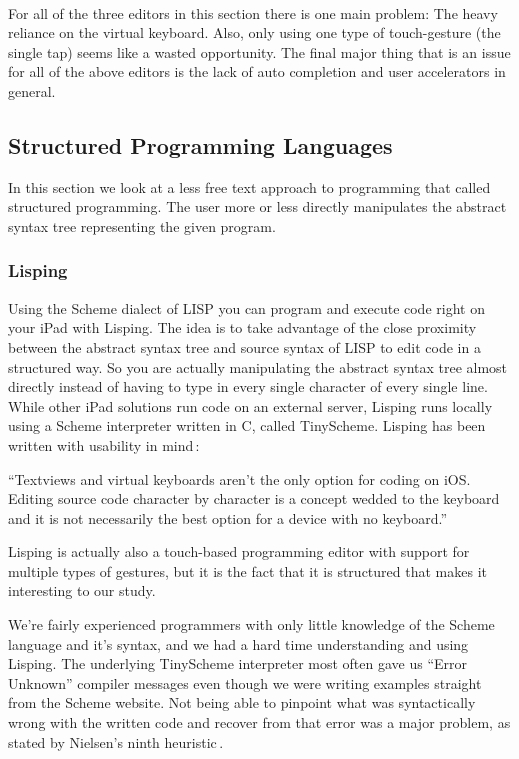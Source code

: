 \paragraph{}

For all of the three editors in this section there is one main problem: The heavy reliance on the virtual keyboard. Also, only using one type of touch-gesture (the single tap) seems like a wasted opportunity. The final major thing that is an issue for all of the above editors is the lack of auto completion and user accelerators in general.


\subsection{Structured Programming Languages}
In this section we look at a less free text approach to programming that called structured programming. The user more or less directly manipulates the abstract syntax tree representing the given program.

\subsubsection{Lisping}

Using the Scheme dialect of LISP you can program and execute code right on your iPad with Lisping. The idea is to take advantage of the close proximity between the abstract syntax tree and source syntax of LISP to edit code in a structured way. So you are actually manipulating the abstract syntax tree almost directly instead of having to type in every single character of every single line. While other iPad solutions run code on an external server, Lisping runs locally using a Scheme interpreter written in C, called TinyScheme. Lisping has been written with usability in mind\,\cite{lisping}: 

``Textviews and virtual keyboards aren't the only option for coding on iOS. Editing source code character by character is a concept wedded to the keyboard and it is not necessarily the best option for a device with no keyboard.''

Lisping is actually also a touch-based programming editor with support for multiple types of gestures, but it is the fact that it is structured that makes it interesting to our study.

We're fairly experienced programmers with only little knowledge of the Scheme language and it's syntax, and we had a hard time understanding and using Lisping. The underlying TinyScheme interpreter most often gave us “Error Unknown” compiler messages even though we were writing examples straight from the Scheme website. Not being able to pinpoint what was syntactically wrong with the written code and recover from that error was a major problem, as stated by Nielsen's ninth heuristic\,\cite{nielsen1990heuristic}.

